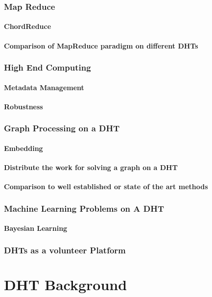\documentclass[10pt,letterpaper]{report}
\begin{document}
\subsection{Map Reduce}
\subsubsection{ChordReduce}
\subsubsection{Comparison of  MapReduce paradigm on different DHTs}


\subsection{High End Computing}
\subsubsection{Metadata Management}
\subsubsection{Robustness}

\subsection{Graph Processing on a DHT}
\subsubsection{Embedding}
\subsubsection{Distribute the work for solving a graph on a DHT}
\subsubsection{Comparison to well established or state of the art methods}

\subsection{Machine Learning Problems on A DHT}
\subsubsection{Bayesian Learning}

\subsection{DHTs as a volunteer Platform}

\chapter{DHT Background}





\end{document}
